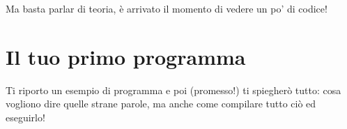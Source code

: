 
	
Ma basta parlar di teoria, è arrivato il momento di vedere un po' di codice!
\section{Il tuo primo programma}
Ti riporto un esempio di programma e poi (promesso!) ti spiegherò tutto: cosa vogliono dire quelle strane parole, ma anche come compilare tutto ciò ed eseguirlo!

